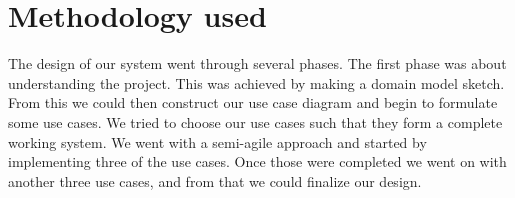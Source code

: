 \section{Methodology used}

The design of our system went through several phases. The first phase was about understanding the project. This was achieved by making a domain model sketch. From this we could then construct our use case diagram and begin to formulate some use cases. We tried to choose our use cases such that they form a complete working system. We went with a semi-agile approach and started by implementing three of the use cases. Once those were completed we went on with another three use cases, and from that we could finalize our design. 